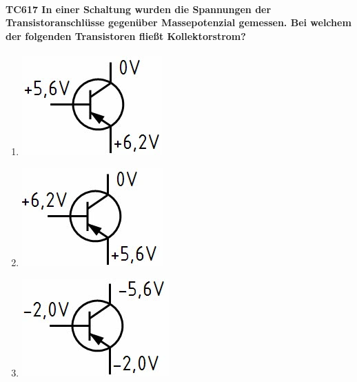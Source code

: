 \documentclass[8pt]{article}
\begin{document}
\begin{enumerate}
\begin{enumerate}[nolistsep,label=\Alph*]
{\begin{enumerate}[nolistsep,label=\Alph*]
\paragraph*{TC617 In einer Schaltung wurden die Spannungen der Transistoranschlüsse gegenüber Massepotenzial gemessen. Bei welchem der folgenden Transistoren fließt Kollektorstrom?}
\begin{enumerate}[nolistsep,label=\Alph*]
\item
	\begin{center}
		\begin{minipage}{\linewidth}
			\centering
			\includegraphics[scale=1.0]{pics/tc617_a.jpg}
		\end{minipage}
	\end{center}
\item
	\begin{center}
		\begin{minipage}{\linewidth}
			\centering
			\includegraphics[scale=1.0]{pics/tc617_b.jpg}
		\end{minipage}
	\end{center}
\item
	\begin{center}
		\begin{minipage}{\linewidth}
			\centering
			\includegraphics[scale=1.0]{pics/tc617_c.jpg}
		\end{minipage}

\end{center}
\end{enumerate}
\end{enumerate}}
\end{enumerate}
\end{enumerate}
\end{document}
